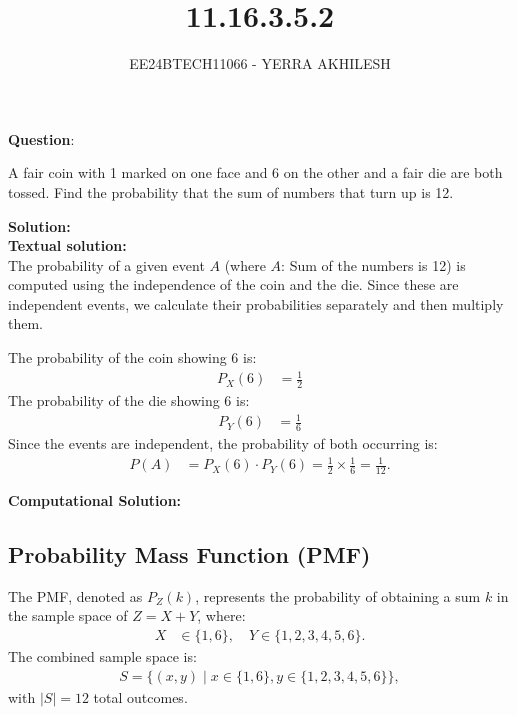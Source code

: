 \documentclass[journal]{IEEEtran}
\begin{document}

\vspace{3cm}

\title{11.16.3.5.2}
\author{EE24BTECH11066 - YERRA AKHILESH}

{\let\newpage\relax\maketitle}

\renewcommand{\thetable}{\arabic{table}}
\setcounter{figure}{0} %
\setcounter{table}{0} %

\textbf{Question}:\

A fair coin with 1 marked on one face and 6 on the other and a fair die are both tossed. Find the probability that the sum of numbers that turn up is 12.\

\textbf{Solution: }\\
\textbf{Textual solution: }\\
The probability of a given event $A$ (where $A$: Sum of the numbers is 12) is computed using the independence of the coin and the die. Since these are independent events, we calculate their probabilities separately and then multiply them.

The probability of the coin showing 6 is:
\begin{align}
P_{X}(6) &= \frac{1}{2}
\end{align}
The probability of the die showing 6 is:
\begin{align}
P_{Y}(6) &= \frac{1}{6}
\end{align}
Since the events are independent, the probability of both occurring is:
\begin{align}
P(A) &= P_{X}(6) \cdot P_{Y}(6) = \frac{1}{2} \times \frac{1}{6} = \frac{1}{12}.
\end{align}

\textbf{Computational Solution:}

\subsection*{Probability Mass Function (PMF)}
The PMF, denoted as $P_Z(k)$, represents the probability of obtaining a sum $k$ in the sample space of $Z = X + Y$, where:
\begin{align}
X &\in \{1, 6\}, \quad Y \in \{1, 2, 3, 4, 5, 6\}.
\end{align}
The combined sample space is:
\begin{align}
S = \{(x, y) \mid x \in \{1, 6\}, y \in \{1, 2, 3, 4, 5, 6\}\},
\end{align}
with $|S| = 12$ total outcomes.
\end{document}
